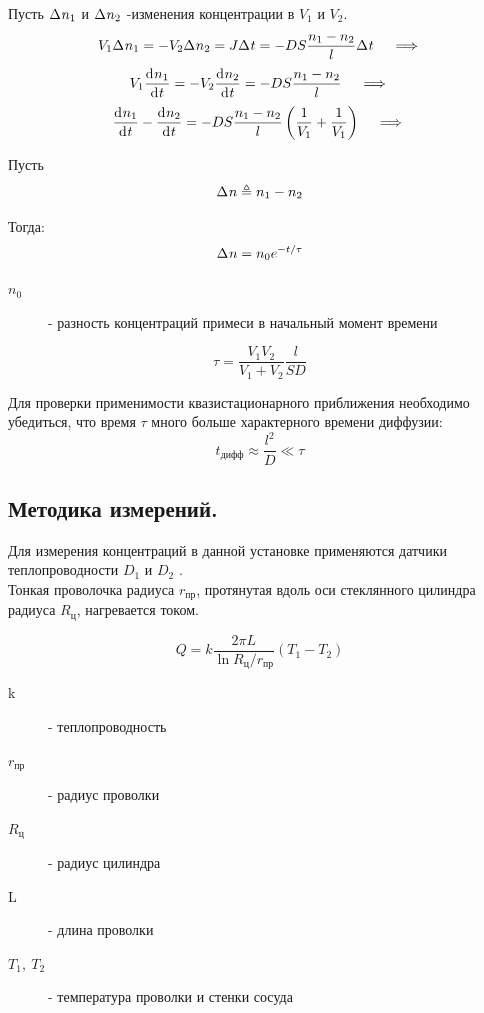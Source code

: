 \documentclass[a4paper,12pt]{article}
\numberwithin{equation}{section}
\begin{document}
Пусть $\D{n_1}$ и $\D{n_2}$ -изменения концентрации в $V_1$ и $V_2$.
\begin{equation}
  V_1 \D{n_1} = -V_2 \D{n_2} = J \D{t} = -DS \frac{n_1 - n_2}{l} \D{t} \quad \implies
\end{equation}
\begin{equation}
  V_1 \deriv{n_1}{t} = -V_2 \deriv{n_2}{t} = -DS \frac{n_1 - n_2}{l} \quad \implies
\end{equation}
\begin{equation}
  \deriv{n_1}{t} - \deriv{n_2}{t} = 
  -DS \frac{n_1 - n_2}{l} \left(\frac{1}{V_1} + \frac{1}{V_1}\right) \quad \implies
\end{equation}

Пусть \[ \D{n} \triangleq n_1 - n_2 \] \par Тогда:
\begin{equation}
  \D{n} = n_0 e^{-t / \tau} \label{eq:delta_n}
\end{equation}
\begin{description}
  \item[$n_0$] - разность концентраций примеси в начальный момент времени
\end{description}

\begin{equation}
  \tau = \frac{V_1 V_2}{V_1 + V_2} \frac{l}{SD}
  \label{eq:1.7}
\end{equation}

Для проверки применимости квазистационарного приближения необходимо убедиться, что время $\tau$ много больше характерного времени диффузии:
\[ t_{\text{дифф}} \approx \frac{l^2}{D} \ll \tau \]

\subsection{Методика измерений.}

Для измерения концентраций в данной установке применяются датчики теплопроводности
$D_1$ и $D_2$ . \\
Тонкая проволочка радиуса $r_\text{пр}$, протянутая вдоль оси стеклянного цилиндра радиуса $R_\text{ц}$, нагревается током.

\begin{equation}
  Q = k \frac{2\pi L}{\ln{R_\text{ц} / r_\text{пр}}} (T_1 - T_2)
\end{equation}
\begin{description}
  \item[k] - теплопроводность
  \item[$r_\text{пр}$] - радиус проволки
  \item[$R_\text{ц}$] - радиус цилиндра
  \item[L] - длина проволки
  \item[$T_1,\ T_2$] - температура проволки и стенки сосуда
\end{description}
\end{document}
